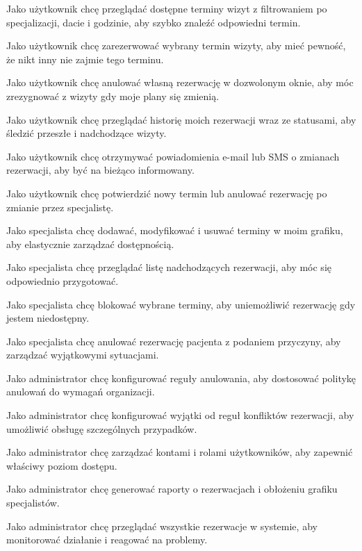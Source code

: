 \documentclass[12pt,a4paper]{article}
\begin{document}
\begin{description}[leftmargin=1.8cm, labelwidth=1.3cm, labelsep=0.5cm, style=nextline]
  \item[US1] Jako użytkownik chcę przeglądać dostępne terminy wizyt z filtrowaniem po specjalizacji, dacie i godzinie, aby szybko znaleźć odpowiedni termin.
  \item[US2] Jako użytkownik chcę zarezerwować wybrany termin wizyty, aby mieć pewność, że nikt inny nie zajmie tego terminu.
  \item[US3] Jako użytkownik chcę anulować własną rezerwację w dozwolonym oknie, aby móc zrezygnować z wizyty gdy moje plany się zmienią.
  \item[US4] Jako użytkownik chcę przeglądać historię moich rezerwacji wraz ze statusami, aby śledzić przeszłe i nadchodzące wizyty.
  \item[US5] Jako użytkownik chcę otrzymywać powiadomienia e-mail lub SMS o zmianach rezerwacji, aby być na bieżąco informowany.
  \item[US6] Jako użytkownik chcę potwierdzić nowy termin lub anulować rezerwację po zmianie przez specjalistę.
  \item[US7] Jako specjalista chcę dodawać, modyfikować i usuwać terminy w moim grafiku, aby elastycznie zarządzać dostępnością.
  \item[US8] Jako specjalista chcę przeglądać listę nadchodzących rezerwacji, aby móc się odpowiednio przygotować.
  \item[US9] Jako specjalista chcę blokować wybrane terminy, aby uniemożliwić rezerwację gdy jestem niedostępny.
  \item[US10] Jako specjalista chcę anulować rezerwację pacjenta z podaniem przyczyny, aby zarządzać wyjątkowymi sytuacjami.
  \item[US11] Jako administrator chcę konfigurować reguły anulowania, aby dostosować politykę anulowań do wymagań organizacji.
  \item[US12] Jako administrator chcę konfigurować wyjątki od reguł konfliktów rezerwacji, aby umożliwić obsługę szczególnych przypadków.
  \item[US13] Jako administrator chcę zarządzać kontami i rolami użytkowników, aby zapewnić właściwy poziom dostępu.
  \item[US14] Jako administrator chcę generować raporty o rezerwacjach i obłożeniu grafiku specjalistów.
  \item[US15] Jako administrator chcę przeglądać wszystkie rezerwacje w systemie, aby monitorować działanie i reagować na problemy.
\end{description}
\end{document}
